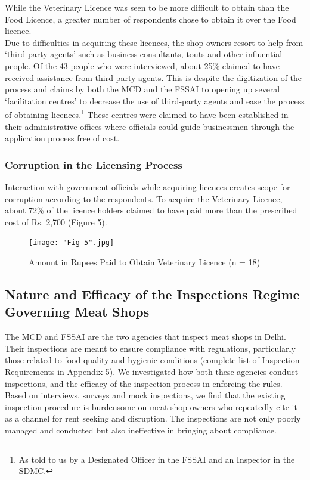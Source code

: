 \documentclass[a4paper, 12pt, twoside]{article}
\begin{document}
While the Veterinary Licence was seen to be more difficult to obtain than the Food Licence, a greater number of respondents chose to obtain it over the Food licence. \\

Due to difficulties in acquiring these licences, the shop owners resort to help from ‘third-party agents’ such as business consultants, touts and other influential people. Of the 43 people who were interviewed, about 25\% claimed to have received assistance from third-party agents. This is despite the digitization of the process and claims by both the MCD and the FSSAI to opening up several ‘facilitation centres’ to decrease the use of third-party agents and ease the process of obtaining licences.\footnote{ As told to us by a Designated Officer in the FSSAI and an Inspector in the SDMC.} These centres were claimed to have been established in their administrative offices where officials could guide businessmen through the application process free of cost. \\

\subsubsection{Corruption in the Licensing Process}

Interaction with government officials while acquiring licences creates scope for corruption according to the respondents. To acquire the Veterinary Licence, about 72\% of the licence holders claimed to have paid more than the prescribed cost of Rs. 2,700 (Figure 5).\\

\begin{figure}[H]
\centering
\texttt{[image: "Fig 5".jpg]}
\captionsetup{justification=centering}\caption[Optional Caption]{Amount in Rupees Paid to Obtain Veterinary Licence (n = 18)}
\end{figure} 

\subsection{Nature and Efficacy of the Inspections Regime Governing Meat Shops}

The MCD and FSSAI are the two agencies that inspect meat shops in Delhi. Their inspections are meant to ensure compliance with regulations, particularly those related to food quality and hygienic conditions (complete list of Inspection Requirements in Appendix 5). We investigated how both these agencies conduct inspections, and the efficacy of the inspection process in enforcing the rules. Based on interviews, surveys and mock inspections, we find that the existing inspection procedure is burdensome on meat shop owners who repeatedly cite it as a channel for rent seeking and disruption. The inspections are not only poorly managed and conducted but also ineffective in bringing about compliance. \\
\end{document}
